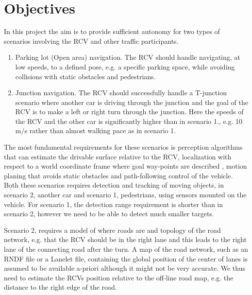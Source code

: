 \documentclass[11pt,a4paper]{article}
\begin{document}
\section{Objectives}

In this project the aim is to provide sufficient autonomy for two
types of scenarios involving the RCV and other traffic participants.


\begin{enumerate}
\item  Parking lot (Open area) navigation. The RCV should handle navigating,
at low speeds, to a defined pose, e.g. a specific parking space, while
avoiding collisions with static obstacles and pedestrians. 


\item  Junction navigation. The RCV should successfully handle a T-junction
scenario where another car is driving through the junction and the
goal of the RCV is to make a left or right turn through the
junction. Here the speeds of the RCV and the other car is
significantly higher than in scenario 1., e.g. 10 m/s rather than
almost walking pace as in scenario 1.



\end{enumerate}

The most fundamental requirements for these scenarios is perception
algorithms that can estimate the drivable surface relative to the RCV,
localization with respect to a world coordinate frame where goal
way-points are described
, motion planing that avoids static obstacles and path-following control of the
vehicle. Both these scenarios requires detection and tracking of moving
objects, in scenario 2, another car and scenario 1, pedestrians, using
sensors mounted on the vehicle. For scenario 1, the detection range
requirement is shorter than in scenario 2, however we need to be able
to detect much smaller targets.

Scenario 2, requires a model of where roads are and topology of the
road network, e.g. that the RCV should be in the right lane and this
leads to the right lane of the connecting road after the turn. A map
of the road network, such as an RNDF file or a Lanelet file, containing
the global position of the center of lanes is assumed to be available a-priori
although it might not be very accurate. We thus need to estimate the
RCVs position relative to the off-line road map, e.g. the distance to
the right edge of the road.
\end{document}
